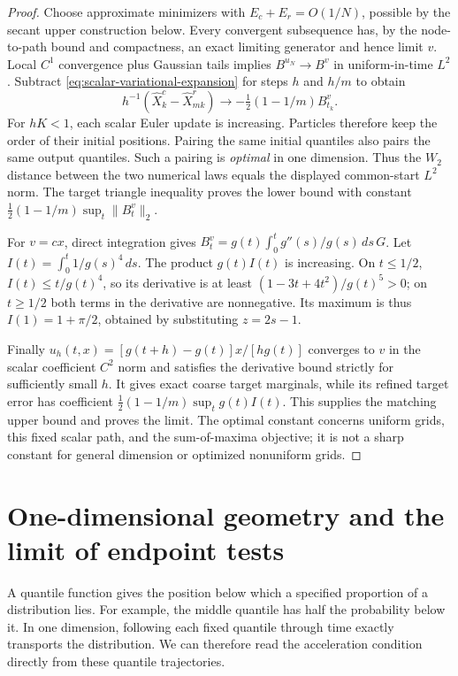 \begin{proof}
Choose approximate minimizers with $E_c+E_r=O(1/N)$, possible by the
secant upper construction below. Every convergent subsequence has, by the
node-to-path bound and compactness, an exact limiting generator and hence
limit $v$. Local $C^1$ convergence plus Gaussian tails implies
$B^{u_N}\to B^v$ in uniform-in-time $L^2$. Subtract
\eqref{eq:scalar-variational-expansion} for steps $h$ and $h/m$ to obtain
\[
 h^{-1}(\widehat X^c_k-\widehat X^r_{mk})
 \longrightarrow-\tfrac12(1-1/m)B^v_{t_k}.
\]
For $hK<1$, each scalar Euler update is increasing. Particles therefore
keep the order of their initial positions. Pairing the same initial
quantiles also pairs the same output quantiles. Such a pairing is
\emph{optimal} in one dimension. Thus the $W_2$ distance between the two
numerical laws equals the displayed common-start $L^2$ norm. The target triangle inequality proves the lower bound with
constant $\tfrac12(1-1/m)\sup_t\|B_t^v\|_2$.

For $v=cx$, direct integration gives
$B_t^v=g(t)\int_0^t g''(s)/g(s)\,ds\,G$.
Let $I(t)=\int_0^t1/g(s)^4\,ds$. The product $g(t)I(t)$ is increasing.
On $t\le1/2$, $I(t)\le t/g(t)^4$, so its derivative is at least
$(1-3t+4t^2)/g(t)^5>0$; on $t\ge1/2$ both terms in the derivative are
nonnegative. Its maximum is thus $I(1)=1+\pi/2$, obtained by substituting
$z=2s-1$.

Finally $u_h(t,x)=[g(t+h)-g(t)]x/[hg(t)]$ converges to $v$ in the scalar
coefficient $C^2$ norm and satisfies the derivative bound strictly for sufficiently small
$h$. It gives exact coarse target marginals, while its refined target
error has coefficient $\tfrac12(1-1/m)\sup_t g(t)I(t)$. This supplies the
matching upper bound and proves the limit. The optimal constant concerns
uniform grids, this fixed scalar path, and the sum-of-maxima objective;
it is not a sharp constant for general dimension or optimized nonuniform
grids.
\end{proof}

\section{One-dimensional geometry and the limit of endpoint tests}
\label{app:observable-geometry}
A quantile function gives the position below which a specified proportion
of a distribution lies. For example, the middle quantile has half the
probability below it. In one dimension, following each fixed quantile
through time exactly transports the distribution. We can therefore read
the acceleration condition directly from these quantile trajectories.\AIassistance


